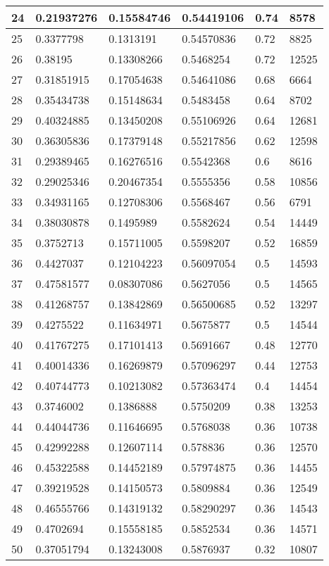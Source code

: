 \begin{longtable}{|l|l|l|l|l|l|}
24 & 0.21937276 & 0.15584746 & 0.54419106 & 0.74 & 8578 \\ \hline 
25 & 0.3377798 & 0.1313191 & 0.54570836 & 0.72 & 8825 \\ \hline 
26 & 0.38195 & 0.13308266 & 0.5468254 & 0.72 & 12525 \\ \hline 
27 & 0.31851915 & 0.17054638 & 0.54641086 & 0.68 & 6664 \\ \hline 
28 & 0.35434738 & 0.15148634 & 0.5483458 & 0.64 & 8702 \\ \hline 
29 & 0.40324885 & 0.13450208 & 0.55106926 & 0.64 & 12681 \\ \hline 
30 & 0.36305836 & 0.17379148 & 0.55217856 & 0.62 & 12598 \\ \hline 
31 & 0.29389465 & 0.16276516 & 0.5542368 & 0.6 & 8616 \\ \hline 
32 & 0.29025346 & 0.20467354 & 0.5555356 & 0.58 & 10856 \\ \hline 
33 & 0.34931165 & 0.12708306 & 0.5568467 & 0.56 & 6791 \\ \hline 
34 & 0.38030878 & 0.1495989 & 0.5582624 & 0.54 & 14449 \\ \hline 
35 & 0.3752713 & 0.15711005 & 0.5598207 & 0.52 & 16859 \\ \hline 
36 & 0.4427037 & 0.12104223 & 0.56097054 & 0.5 & 14593 \\ \hline 
37 & 0.47581577 & 0.08307086 & 0.5627056 & 0.5 & 14565 \\ \hline 
38 & 0.41268757 & 0.13842869 & 0.56500685 & 0.52 & 13297 \\ \hline 
39 & 0.4275522 & 0.11634971 & 0.5675877 & 0.5 & 14544 \\ \hline 
40 & 0.41767275 & 0.17101413 & 0.5691667 & 0.48 & 12770 \\ \hline 
41 & 0.40014336 & 0.16269879 & 0.57096297 & 0.44 & 12753 \\ \hline 
42 & 0.40744773 & 0.10213082 & 0.57363474 & 0.4 & 14454 \\ \hline 
43 & 0.3746002 & 0.1386888 & 0.5750209 & 0.38 & 13253 \\ \hline 
44 & 0.44044736 & 0.11646695 & 0.5768038 & 0.36 & 10738 \\ \hline 
45 & 0.42992288 & 0.12607114 & 0.578836 & 0.36 & 12570 \\ \hline 
46 & 0.45322588 & 0.14452189 & 0.57974875 & 0.36 & 14455 \\ \hline 
47 & 0.39219528 & 0.14150573 & 0.5809884 & 0.36 & 12549 \\ \hline 
48 & 0.46555766 & 0.14319132 & 0.58290297 & 0.36 & 14543 \\ \hline 
49 & 0.4702694 & 0.15558185 & 0.5852534 & 0.36 & 14571 \\ \hline 
50 & 0.37051794 & 0.13243008 & 0.5876937 & 0.32 & 10807 \\ \hline 
\end{longtable}